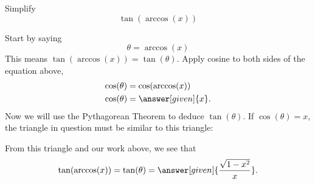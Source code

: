 \documentclass{ximera}
\begin{document}
\begin{example}
  Simplify
  \[
  \tan(\arccos(x))
  \]
  \begin{explanation}
    Start by saying
    \[
    \theta = \arccos(x)
    \]
    This means $\tan(\arccos(x)) = \tan(\theta)$. Apply cosine to both
    sides of the equation above,
    \begin{align*}
      \cos(\theta) &= \cos(\arccos(x))\\
      \cos(\theta) &= \answer[given]{x}.
    \end{align*}
    Now we will use the Pythagorean Theorem to deduce
    $\tan(\theta)$. If $\cos(\theta)=x$, the triangle in question must
    be similar to this triangle:
    \begin{image}
    \end{image}
    From this triangle and our work above, we see that
    \[
    \tan(\arccos(x)) = \tan(\theta) = \answer[given]{\frac{\sqrt{1-x^2}}{x}}.
    \]
  \end{explanation}
\end{example}
\end{document}
